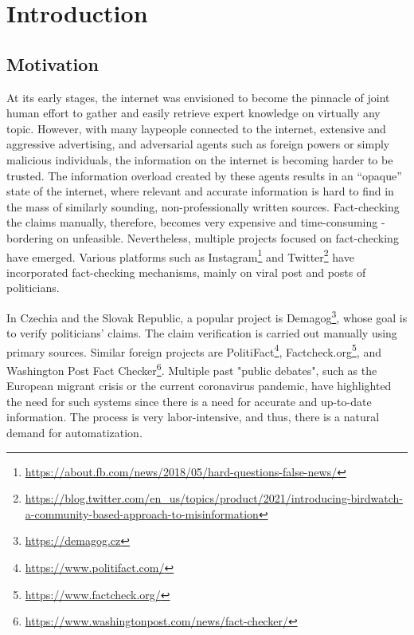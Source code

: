 \chapter*{Introduction}
\section*{Motivation}
At its early stages, the internet was envisioned to become the pinnacle of joint human effort to gather and easily retrieve expert knowledge on virtually any topic.
However, with many laypeople connected to the internet, extensive and aggressive advertising, and adversarial agents such as foreign powers or simply malicious individuals, the information on the internet is becoming harder to be trusted.
The information overload created by these agents results in an ``opaque'' state of the internet, where relevant and accurate information is hard to find in the mass of similarly sounding, non-professionally written sources.
Fact-checking the claims manually, therefore, becomes very expensive and time-consuming - bordering on unfeasible.
Nevertheless, multiple projects focused on fact-checking have emerged. 
Various platforms such as Instagram\footnote{\url{https://about.fb.com/news/2018/05/hard-questions-false-news/}} and Twitter\footnote{\url{https://blog.twitter.com/en_us/topics/product/2021/introducing-birdwatch-a-community-based-approach-to-misinformation}} have incorporated fact-checking mechanisms, mainly on viral post and posts of politicians. 

In Czechia and the Slovak Republic, a popular project is Demagog\footnote{\url{https://demagog.cz}}, whose goal is to verify politicians' claims.
The claim verification is carried out manually using primary sources. 
Similar foreign projects are PolitiFact\footnote{\url{https://www.politifact.com/}}, Factcheck.org\footnote{\url{https://www.factcheck.org/}}, and Washington Post Fact Checker\footnote{\url{https://www.washingtonpost.com/news/fact-checker/}}.
Multiple past "public debates", such as the European migrant crisis or the current coronavirus pandemic, have highlighted the need for such systems since there is a need for accurate and up-to-date information.
The process is very labor-intensive, and thus, there is a natural demand for automatization.

